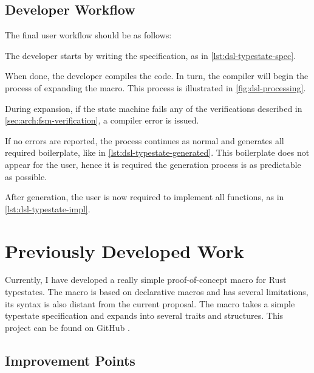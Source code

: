 \subsection{Developer Workflow}
The final user workflow should be as follows:
\begin{compactenum}
    \item The developer starts by writing the specification, as in \autoref{lst:dsl-typestate-spec}.
    \item When done, the developer compiles the code.
    In turn, the compiler will begin the process of expanding the macro.
    This process is illustrated in \autoref{fig:dsl-processing}.
    \begin{compactitem}
        \item During expansion, if the state machine fails any of the verifications described in \autoref{sec:arch:fsm-verification},
        a compiler error is issued.
        \item If no errors are reported, the process continues as normal and generates all required boilerplate, like in \autoref{lst:dsl-typestate-generated}.
        This boilerplate does not appear for the user, hence it is required the generation process is as predictable as possible.
    \end{compactitem}
    \item After generation, the user is now required to implement all functions, as in \autoref{lst:dsl-typestate-impl}.
\end{compactenum}


\section{Previously Developed Work}

Currently, I have developed a really simple proof-of-concept macro for Rust typestates.
The macro is based on declarative macros and has several limitations,
its syntax is also distant from the current proposal.
The macro takes a simple typestate specification and expands into several traits and structures.
This project can be found on GitHub \autocite{Duarte2020a}.

\subsection{Improvement Points}

